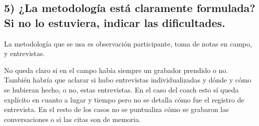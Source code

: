 \subsection*{5) ¿La metodología está claramente formulada? Si no lo estuviera, indicar las dificultades.}\label{la-metodologuxeda-estuxe1-claramente-formulada-si-no-lo-estuviera-indicar-las-dificultades.}

La metodología que
se usa es observación participante, toma de notas en campo, y entrevistas.

No queda claro si en el campo había siempre un grabador
prendido o no. También habría que aclarar si hubo entrevistas
individualizadas y dónde y cómo se hubieran hecho, o no, estas
entrevistas. En el caso del coach esto sí queda explícito en cuanto
a lugar y tiempo pero no se detalla cómo fue el registro de entrevista.
En el resto de los casos no se puntualiza cómo se grabaron las
conversaciones o si las citas son de memoria.


